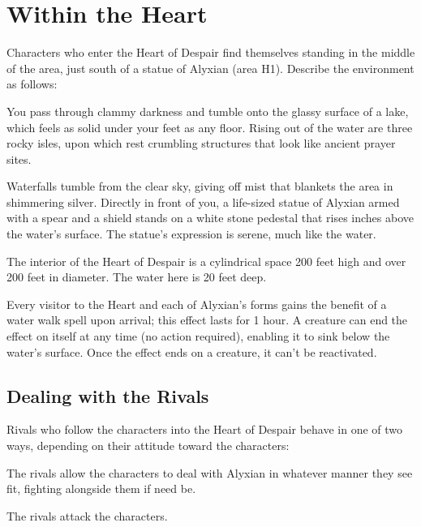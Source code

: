 \documentclass[10pt,a4paper,twoside,twocolumn,openany,nodeprecatedcode]{dndbook}
\begin{document}
\section{Within the Heart}
Characters who enter the Heart of Despair find themselves standing in the middle of the area, just south of a statue of Alyxian (area H1). Describe the environment as follows:

\begin{DndReadAloud}{}
You pass through clammy darkness and tumble onto the glassy surface of a lake, which feels as solid under your feet as any floor. Rising out of the water are three rocky isles, upon which rest crumbling structures that look like ancient prayer sites.

Waterfalls tumble from the clear sky, giving off mist that blankets the area in shimmering silver. Directly in front of you, a life-sized statue of Alyxian armed with a spear and a shield stands on a white stone pedestal that rises inches above the water's surface. The statue's expression is serene, much like the water.

\end{DndReadAloud}

The interior of the Heart of Despair is a cylindrical space 200 feet high and over 200 feet in diameter. The water here is 20 feet deep.

Every visitor to the Heart and each of Alyxian's forms gains the benefit of a water walk spell upon arrival; this effect lasts for 1 hour. A creature can end the effect on itself at any time (no action required), enabling it to sink below the water's surface. Once the effect ends on a creature, it can't be reactivated.

\subsection{Dealing with the Rivals}
Rivals who follow the characters into the Heart of Despair behave in one of two ways, depending on their attitude toward the characters:


\begin{description}[nolistsep]
\item[Friendly or Indifferent Rivals.]
The rivals allow the characters to deal with Alyxian in whatever manner they see fit, fighting alongside them if need be.
\item[Hostile Rivals.]
The rivals attack the characters.
\end{description}
\end{document}
